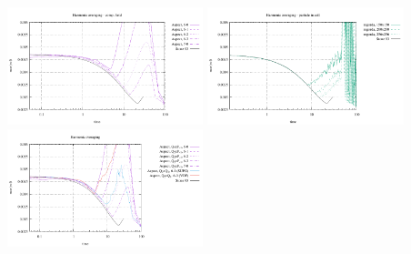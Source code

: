 \begin{center}
\includegraphics[width=5.7cm]{images/stokes_sphere_fs2D/max_vel_harm_comp}
\includegraphics[width=5.7cm]{images/stokes_sphere_fs2D/max_vel_harm_pic}
\includegraphics[width=5.7cm]{images/stokes_sphere_fs2D/max_vel_harm_add}
\end{center}


